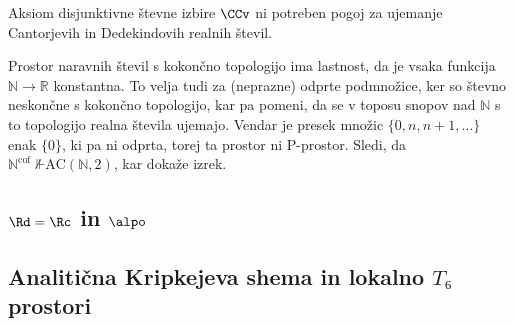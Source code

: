 \begin{izrek}
  Aksiom disjunktivne števne izbire \(\CCv\) ni potreben pogoj za ujemanje
  Cantorjevih in Dedekindovih realnih števil.
\end{izrek}
\begin{dokaz}
  Prostor naravnih števil s kokončno topologijo ima lastnost, da je vsaka
  funkcija \(ℕ → ℝ\) konstantna. To velja tudi za (neprazne) odprte podmnožice,
  ker so števno neskončne s kokončno topologijo, kar pa pomeni, da se v toposu
  snopov nad \(ℕ\) s to topologijo realna števila ujemajo. Vendar je presek
  množic \(\{0, n, n+1, …\} \) enak \(\{0\}\), ki pa ni odprta, torej ta prostor
  ni P-prostor. Sledi, da \({ℕ^{\text{cof}}~\not⊩ \mathrm{AC}(ℕ, 2)}\), kar
  dokaže izrek.
\end{dokaz}


\subsection{\texorpdfstring{\(\Rd = \Rc\)}{ℝ_d = ℝ_c} in \(\alpo\)}

\begin{trditev}
  
\end{trditev}


\subsection{Analitična Kripkejeva shema in lokalno \(T₆\) prostori}


